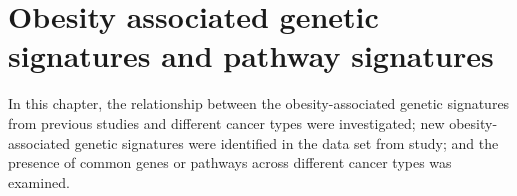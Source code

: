 \chapter{Obesity associated genetic signatures and pathway signatures}
\label{cha:obesity_associated_genetic_signature_and_pathway_signatures}

In this chapter, the relationship between the obesity-associated genetic signatures from previous studies and different cancer types were investigated; new obesity-associated genetic signatures were identified in the data set from \citet{Creighton2012} study; and the presence of common genes or pathways across different cancer types was examined.

